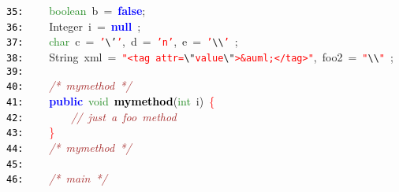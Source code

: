 \documentclass{article}
\begin{document}
\mbox{}\texttt{\textcolor{Black}{35:}} \ \ \ \ \textcolor{ForestGreen}{boolean}\ b\ \textcolor{BrickRed}{=}\ \textbf{\textcolor{Blue}{false}}\textcolor{BrickRed}{;} \\
\mbox{}\texttt{\textcolor{Black}{36:}} \ \ \ \ \textcolor{TealBlue}{Integer}\ i\ \textcolor{BrickRed}{=}\ \textbf{\textcolor{Blue}{null}}\ \textcolor{BrickRed}{;} \\
\mbox{}\texttt{\textcolor{Black}{37:}} \ \ \ \ \textcolor{ForestGreen}{char}\ c\ \textcolor{BrickRed}{=}\ \texttt{\textcolor{Red}{'}}\texttt{\textcolor{CarnationPink}{\textbackslash{}'}}\texttt{\textcolor{Red}{'}}\textcolor{BrickRed}{,}\ d\ \textcolor{BrickRed}{=}\ \texttt{\textcolor{Red}{'n'}}\textcolor{BrickRed}{,}\ e\ \textcolor{BrickRed}{=}\ \texttt{\textcolor{Red}{'}}\texttt{\textcolor{CarnationPink}{\textbackslash{}\textbackslash{}}}\texttt{\textcolor{Red}{'}}\ \textcolor{BrickRed}{;} \\
\mbox{}\texttt{\textcolor{Black}{38:}} \ \ \ \ \textcolor{TealBlue}{String}\ xml\ \textcolor{BrickRed}{=}\ \texttt{\textcolor{Red}{"{}\textless{}tag\ attr=}}\texttt{\textcolor{CarnationPink}{\textbackslash{}"{}}}\texttt{\textcolor{Red}{value}}\texttt{\textcolor{CarnationPink}{\textbackslash{}"{}}}\texttt{\textcolor{Red}{\textgreater{}\&auml;\textless{}/tag\textgreater{}"{}}}\textcolor{BrickRed}{,}\ foo2\ \textcolor{BrickRed}{=}\ \texttt{\textcolor{Red}{"{}}}\texttt{\textcolor{CarnationPink}{\textbackslash{}\textbackslash{}}}\texttt{\textcolor{Red}{"{}}}\ \textcolor{BrickRed}{;} \\
\mbox{}\texttt{\textcolor{Black}{39:}}  \\
\mbox{}\texttt{\textcolor{Black}{40:}} \ \ \ \ \textit{\textcolor{Brown}{/*\ mymethod\ */}} \\
\mbox{}\texttt{\textcolor{Black}{41:}} \ \ \ \ \textbf{\textcolor{Blue}{public}}\ \textcolor{ForestGreen}{void}\ \textbf{\textcolor{Black}{mymethod}}\textcolor{BrickRed}{(}\textcolor{ForestGreen}{int}\ i\textcolor{BrickRed}{)}\ \textcolor{Red}{\{} \\
\mbox{}\texttt{\textcolor{Black}{42:}} \ \ \ \ \ \ \ \ \textit{\textcolor{Brown}{//\ just\ a\ foo\ method}} \\
\mbox{}\texttt{\textcolor{Black}{43:}} \ \ \ \ \textcolor{Red}{\}} \\
\mbox{}\texttt{\textcolor{Black}{44:}} \ \ \ \ \textit{\textcolor{Brown}{/*\ mymethod\ */}} \\
\mbox{}\texttt{\textcolor{Black}{45:}} \ \ \  \\
\mbox{}\texttt{\textcolor{Black}{46:}} \ \ \ \ \textit{\textcolor{Brown}{/*\ main\ */}} \\
\end{document}
